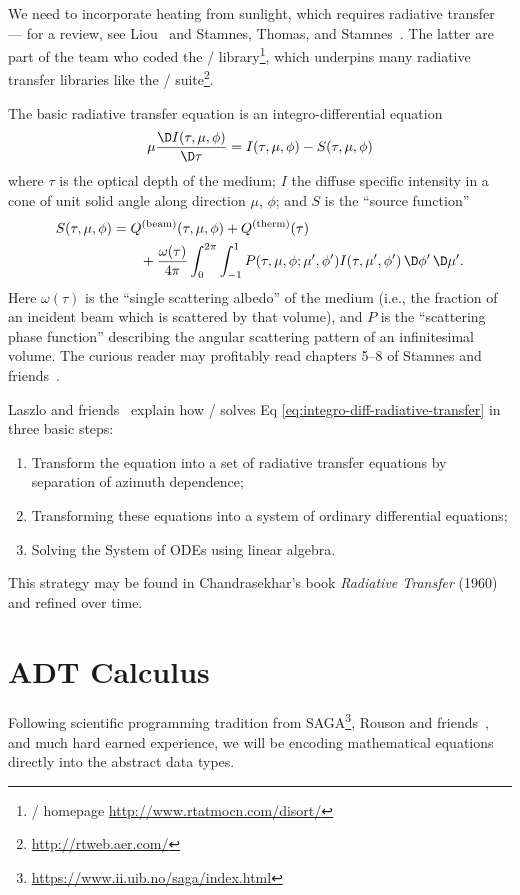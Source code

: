 We need to incorporate heating from sunlight, which requires radiative
transfer --- for a review, see Liou~\cite{liou2002introduction} and
Stamnes, Thomas, and Stamnes~\cite{stamnes_thomas_stamnes_2017}.
The latter are part of the team who coded the \DISORT/\index{\DISORT/}
library\footnote{\DISORT/ homepage \url{http://www.rtatmocn.com/disort/}},
which underpins many radiative transfer libraries like the
\RRTM/\index{\RRTM/} suite\footnote{\url{http://rtweb.aer.com/}}.

The basic radiative transfer equation is an integro-differential
equation
\begin{equation}\label{eq:integro-diff-radiative-transfer}
  \mu\frac{\D I(\tau,\mu,\phi)}{\D\tau}
  = I(\tau, \mu, \phi) - S(\tau, \mu, \phi)
\end{equation}
where $\tau$ is the optical depth of the medium; $I$ the diffuse
specific intensity in a cone of unit solid angle along direction $\mu$,
$\phi$; and $S$ is the ``source function''
\begin{equation}
  \begin{split}
    S(\tau, \mu, \phi) &= Q^{\text{(beam)}}(\tau,\mu,\phi)  + Q^{\text{(therm)}}(\tau) \\
    &\qquad + \frac{\omega(\tau)}{4\pi}
  \int^{2\pi}_{0}\int^{1}_{-1} P(\tau,\mu,\phi;\mu',\phi')I(\tau,\mu',\phi')\,\D\phi'\,\D\mu'.
  \end{split}
\end{equation}
Here $\omega(\tau)$ is the ``single scattering albedo'' of the medium
(i.e., the fraction of an incident beam which is scattered by that
volume), and $P$ is the ``scattering phase function'' describing the
angular scattering pattern of an infinitesimal volume. The curious
reader may profitably read chapters 5--8 of Stamnes and
friends~\cite{stamnes_thomas_stamnes_2017}.

\begin{note}
Laszlo and friends~\cite{Laszlo2016} explain how \DISORT/ solves Eq
\eqref{eq:integro-diff-radiative-transfer} in three basic steps:
\begin{enumerate}
\item Transform the equation into a set of radiative transfer equations
  by separation of azimuth dependence;
\item Transforming these equations into a system of ordinary
  differential equations;
\item Solving the System of ODEs using linear algebra.
\end{enumerate}
This strategy may be found in Chandrasekhar's book
\emph{Radiative Transfer} (1960) and refined over time.
\end{note}


\section{ADT Calculus}

Following scientific programming tradition from SAGA\footnote{\url{https://www.ii.uib.no/saga/index.html}},
Rouson and friends~\cite{rouson2011scientific,rouson2008grid}, and much
hard earned experience, we will be encoding mathematical equations
directly into the abstract data types.
